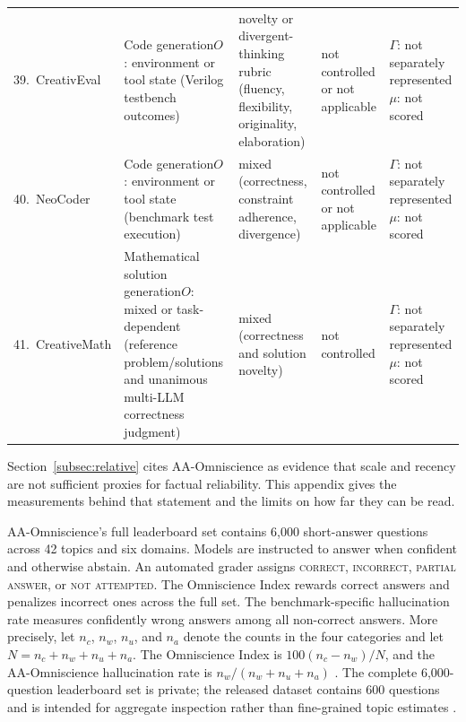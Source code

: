 \documentclass{clv2025}
\begin{document}
\begin{table}[t]
\begin{tabularx}{0.99\linewidth}{
  @{}P{0.17\textwidth}P{0.25\textwidth}
  P{0.15\textwidth}P{0.14\textwidth}Y@{}}
39.~CreativEval \citep{delorenzo_creativeval_2024} & Code generation\newline $O$: environment or tool state (Verilog testbench outcomes) & novelty or divergent-thinking rubric (fluency, flexibility, originality, elaboration) & not controlled or not applicable & $\Gamma$: not separately represented\newline $\mu$: not scored\\
40.~NeoCoder \citep{lu_benchmarking_2025} & Code generation\newline $O$: environment or tool state (benchmark test execution) & mixed (correctness, constraint adherence, divergence) & not controlled or not applicable & $\Gamma$: not separately represented\newline $\mu$: not scored\\
41.~CreativeMath \citep{ye_assessing_2025} & Mathematical solution generation\newline $O$: mixed or task-dependent (reference problem/solutions and unanimous multi-LLM correctness judgment) & mixed (correctness and solution novelty) & not controlled & $\Gamma$: not separately represented\newline $\mu$: not scored\\
\bottomrule
\end{tabularx}
\end{table}

\clearpage
{}%
\makeatletter\def\@currentlabel{C}\makeatother\label{app:omniscience}

Section~\ref{subsec:relative} cites AA-Omniscience as evidence that scale and
recency are not sufficient proxies for factual reliability.
This appendix gives the measurements behind that statement and the limits on
how far they can be read.

AA-Omniscience's full leaderboard set contains 6,000 short-answer questions
across 42 topics and six domains.
Models are instructed to answer when confident and otherwise abstain. An
automated grader assigns \textsc{correct}, \textsc{incorrect},
\textsc{partial answer}, or \textsc{not attempted}. The Omniscience Index
rewards correct answers and penalizes incorrect ones across the full set. The
benchmark-specific hallucination rate measures confidently wrong answers among
all non-correct answers. More precisely, let $n_{c}$, $n_{w}$, $n_{u}$, and
$n_{a}$ denote the counts in the four categories and let
$N=n_{c}+n_{w}+n_{u}+n_{a}$. The Omniscience Index is
$100(n_{c}-n_{w})/N$, and the AA-Omniscience hallucination rate is
$n_{w}/(n_{w}+n_{u}+n_{a})$ \citep{jackson_aaomniscience_2025}.
The complete 6,000-question leaderboard set is private; the released dataset
contains 600 questions and is intended for aggregate inspection rather than
fine-grained topic estimates
\citep{artificialanalysis_aaomniscience_public_2025}.
\end{document}
